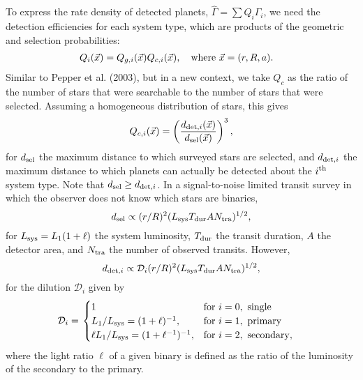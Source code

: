 To express the rate density of detected planets, $\hat{\Gamma} = \sum 
Q_i\Gamma_i$, we need the detection efficiencies for each system type, which 
are products of the geometric and selection probabilities:
\begin{align}
Q_i(\vec{x}) &= Q_{g,i}(\vec{x}) Q_{c,i}(\vec{x}),\quad {\rm where}\ 
\vec{x}=(r,R,a).
\label{eq:general_detection_efficiency}
\end{align}
Similar to Pepper et al. (2003), but in a new context, we take $Q_c$ as the 
ratio of the number of stars that were searchable to the number of stars that 
were selected.
Assuming a homogeneous distribution of stars, this gives
\begin{equation}
Q_{c,i}(\vec{x}) = \left(
\frac{d_{{\rm det},i}(\vec{x})}{d_{\rm sel}(\vec{x})}
\right)^3,
\end{equation}
for $d_{\rm sel}$ the maximum distance to which surveyed stars are selected, 
and $d_{{\rm det},i}$ the maximum distance to which planets can actually be 
detected about the $i^{\rm th}$ system type.
Note that $d_{\rm sel} \geq d_{{\rm det},i}$.
In a signal-to-noise limited transit survey in which the observer does not 
know which stars are binaries, 
\begin{equation}
d_{\rm sel} \propto (r/R)^2 (L_{\rm sys} T_{\rm dur} A N_{\rm tra})^{1/2},
\end{equation}
for $L_{\rm sys}=L_1(1+\ell)$ the system luminosity, $T_{\rm dur}$ the 
transit duration, $A$ the detector area, and $N_{\rm tra}$ 
the number of observed transits.
However,
\begin{equation}
d_{{\rm det},i} \propto \mathcal{D}_i(r/R)^2 (L_{\rm sys} T_{\rm dur} A N_{\rm 
tra})^{1/2},
\label{eq:d_det_i}
\end{equation}
for the dilution $\mathcal{D}_i$ given by
\begin{align}
\mathcal{D}_i
&=
\left.
\begin{cases}
1 & \text{for } i=0,\ {\rm single} \\
L_1 / L_{\rm sys} = (1+\ell)^{-1}, & \text{for } i=1,\ {\rm primary} \\
\ell L_1 / L_{\rm sys} = (1 + \ell^{-1})^{-1}, & 
    \text{for } i=2,\ {\rm secondary},
\end{cases}
\right.
\label{eq:dilution}
\end{align}
where the light ratio $\ell$ of a given binary is defined as the ratio of 
the luminosity of the secondary to the primary.

